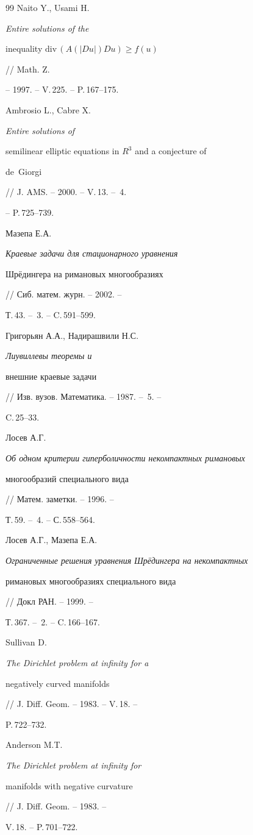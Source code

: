 \begin{thebibliography}{99}
 Naito Y., Usami H. {\em Entire solutions of the


inequality $\mathrm{div}\,(A(|Du|)Du)\geq f(u)$} // Math. Z.


-- 1997. -- V.\,225. -- P.\,167--175. 





 Ambrosio L., Cabre X. {\em Entire solutions of


semilinear elliptic equations in $R^3$ and a conjecture of


de~Giorgi} // J. AMS. -- 2000. -- V.\,13. -- \No\,4.


-- P.\,725--739.





 Мазепа Е.А. {\em Краевые задачи для стационарного уравнения


Шр\"едингера на римановых многообразиях} // Сиб. матем. журн. -- 2002. --


Т.\,43. -- \No\,3. -- C.\,591--599. 





 Григорьян А.А., Надирашвили Н.С. {\em Лиувиллевы теоремы и


внешние краевые задачи} //  Изв. вузов. Математика. -- 1987. -- \No\,5. -- 


C.\,25--33.


 


 Лосев А.Г.  


{\em Об одном критерии гиперболичности некомпактных римановых


многообразий специального вида} // Матем. заметки. -- 1996. --


Т.\,59. -- \No\,4. -- С.\,558--564.





 Лосев А.Г., Мазепа Е.А. 


{\em Ограниченные решения уравнения Шр\"едингера на некомпактных


римановых многообразиях специального вида} // Докл РАН. -- 1999. --


Т.\,367. -- \No\,2. -- C.\,166--167. 





 Sullivan D. {\em The Dirichlet problem at infinity for a


negatively curved manifolds} // J. Diff. Geom. -- 1983. -- V.\,18. --


P.\,722--732. 





 Anderson M.T. {\em The Dirichlet problem at infinity for


manifolds with negative curvature} // J. Diff. Geom. -- 1983. --


V.\,18. -- P.\,701--722.








\end{thebibliography}
